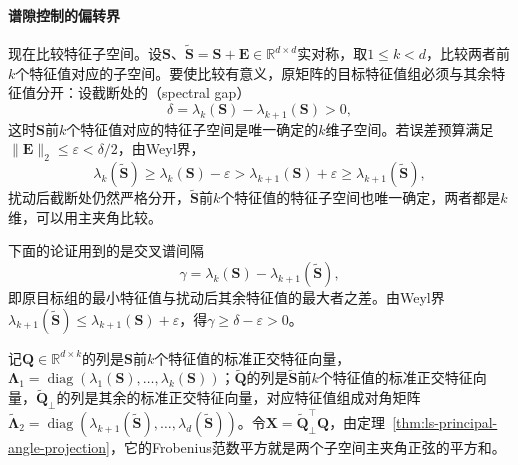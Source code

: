 \paragraph{谱隙控制的偏转界}

现在比较特征子空间。设$\bm S$、$\widetilde{\bm S}=\bm S+\bm E\in\mathbb R^{d\times d}$实对称，取$1\leq k<d$，比较两者前$k$个特征值对应的子空间。要使比较有意义，原矩阵的目标特征值组必须与其余特征值分开：设截断处的（spectral gap）
\[
 \delta=\lambda_k(\bm S)-\lambda_{k+1}(\bm S)>0 ,
\]
这时$\bm S$前$k$个特征值对应的特征子空间是唯一确定的$k$维子空间。若误差预算满足$\lVert\bm E\rVert_2\leq\varepsilon<\delta/2$，由Weyl界，
\[
 \lambda_k(\widetilde{\bm S})\geq\lambda_k(\bm S)-\varepsilon>\lambda_{k+1}(\bm S)+\varepsilon\geq\lambda_{k+1}(\widetilde{\bm S}),
\]
扰动后截断处仍然严格分开，$\widetilde{\bm S}$前$k$个特征值的特征子空间也唯一确定，两者都是$k$维，可以用主夹角比较。

下面的论证用到的是交叉谱间隔
\[
 \gamma=\lambda_k(\bm S)-\lambda_{k+1}(\widetilde{\bm S}),
\]
即原目标组的最小特征值与扰动后其余特征值的最大者之差。由Weyl界$\lambda_{k+1}(\widetilde{\bm S})\leq\lambda_{k+1}(\bm S)+\varepsilon$，得$\gamma\geq\delta-\varepsilon>0$。

记$\bm Q\in\mathbb R^{d\times k}$的列是$\bm S$前$k$个特征值的标准正交特征向量，$\bm\Lambda_1=\operatorname{diag}(\lambda_1(\bm S),\ldots,\lambda_k(\bm S))$；$\widetilde{\bm Q}$的列是$\widetilde{\bm S}$前$k$个特征值的标准正交特征向量，$\widetilde{\bm Q}_\perp$的列是其余的标准正交特征向量，对应特征值组成对角矩阵$\widetilde{\bm\Lambda}_2=\operatorname{diag}(\lambda_{k+1}(\widetilde{\bm S}),\ldots,\lambda_d(\widetilde{\bm S}))$。令$\bm X=\widetilde{\bm Q}_\perp^\top\bm Q$，由定理~\ref{thm:ls-principal-angle-projection}，它的Frobenius范数平方就是两个子空间主夹角正弦的平方和。

